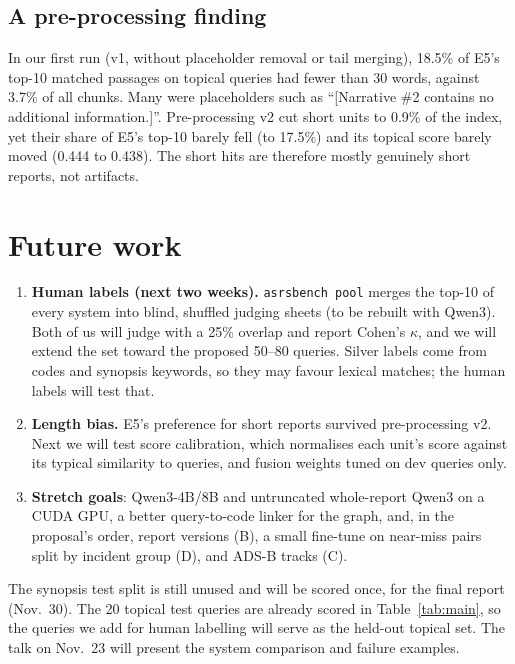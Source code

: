 \documentclass[conference]{IEEEtran}
\begin{document}
\subsection{A pre-processing finding}\label{sec:prep-finding}
In our first run (v1, without placeholder removal or tail merging), 18.5\% of E5's top-10
matched passages on topical queries had fewer than 30 words, against 3.7\% of all chunks.
Many were placeholders such as ``[Narrative \#2 contains no additional information.]''.
Pre-processing v2 cut short units to 0.9\% of the index, yet their share of E5's top-10
barely fell (to 17.5\%) and its topical score barely moved (0.444 to 0.438). The short hits
are therefore mostly genuinely short reports, not artifacts.

\section{Future work}
\begin{enumerate}
\item \textbf{Human labels (next two weeks).} \texttt{asrsbench pool} merges the
top-10 of every system into blind, shuffled judging sheets (to be rebuilt with Qwen3). Both of us will judge with a
25\% overlap and report Cohen's $\kappa$, and we will extend the set toward the proposed
50--80 queries. Silver labels come from codes and synopsis keywords, so they may favour
lexical matches; the human labels will test that.
\item \textbf{Length bias.} E5's preference for short reports survived pre-processing
v2. Next we will test score calibration, which normalises each unit's score
against its typical similarity to queries, and fusion weights tuned on dev queries only.
\item \textbf{Stretch goals}: Qwen3-4B/8B and untruncated whole-report Qwen3 on a CUDA
GPU, a better query-to-code linker for the graph, and, in the proposal's order, report
versions (B), a small
fine-tune on near-miss pairs split by incident group (D), and ADS-B tracks (C).
\end{enumerate}
The synopsis test split is still unused and will be scored once, for the final report
(Nov.~30). The 20 topical test queries are already scored in Table~\ref{tab:main}, so the
queries we add for human labelling will serve as the held-out topical set. The talk on Nov.~23 will present the system comparison
and failure examples.



\end{document}
